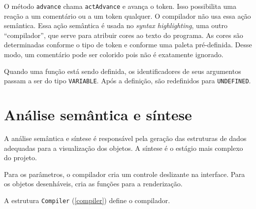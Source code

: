 O método \texttt{advance} chama \texttt{actAdvance} e avança o token.
Isso possibilita uma reação a um comentário ou a um token qualquer.
O compilador não usa essa ação semântica.
Essa ação semântica é usada no \textit{syntax highlighting},
uma outro ``compilador'', que serve para atribuir cores ao texto do programa.
As cores são determinadas conforme o tipo de token e conforme uma 
paleta pré-definida.
Desse modo, um comentário pode ser colorido pois não é exatamente ignorado.

Quando uma função está sendo definida, os identificadores de seus argumentos
passam a ser do tipo \texttt{VARIABLE}.
Após a definição, são redefinidos para \texttt{UNDEFINED}.

\section{Análise semântica e síntese}
A análise semântica e síntese é responsável pela geração das estruturas de dados
adequadas para a visualização dos objetos.
A síntese é o estágio mais complexo do projeto.

Para os parâmetros, o compilador cria um controle deslizante na interface.
Para os objetos desenháveis, cria as funções para a renderização.

\newpage
A estrutura \texttt{Compiler} (\ref{compiler}) define o compilador.

